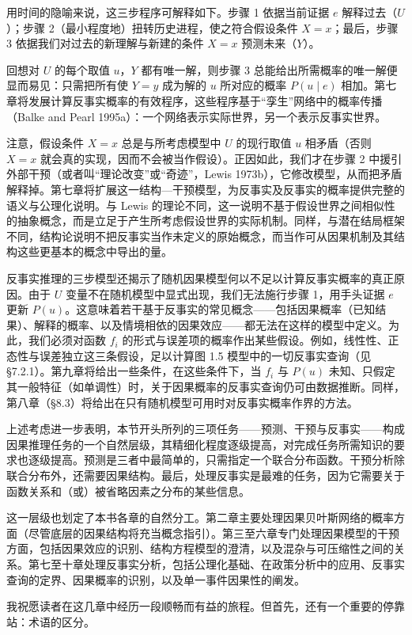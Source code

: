 用时间的隐喻来说，这三步程序可解释如下。步骤 1 依据当前证据 $e$ 解释过去（$U$）；步骤 2（最小程度地）扭转历史进程，使之符合假设条件 $X=x$；最后，步骤 3 依据我们对过去的新理解与新建的条件 $X=x$ 预测未来（$Y$）。

回想对 $U$ 的每个取值 $u$，$Y$ 都有唯一解，则步骤 3 总能给出所需概率的唯一解便显而易见：只需把所有使 $Y=y$ 成为解的 $u$ 所对应的概率 $P(u\mid e)$ 相加。第七章将发展计算反事实概率的有效程序，这些程序基于“孪生”网络中的概率传播（Balke and Pearl 1995a）：一个网络表示实际世界，另一个表示反事实世界。

注意，假设条件 $X=x$ 总是与所考虑模型中 $U$ 的现行取值 $u$ 相矛盾（否则 $X=x$ 就会真的实现，因而不会被当作假设）。正因如此，我们才在步骤 2 中援引外部干预（或者叫“理论改变”或“奇迹”，Lewis 1973b），它修改模型，从而把矛盾解释掉。第七章将扩展这一结构—干预模型，为反事实及反事实的概率提供完整的语义与公理化说明。与 Lewis 的理论不同，这一说明不基于假设世界之间相似性的抽象概念，而是立足于产生所考虑假设世界的实际机制。同样，与潜在结局框架不同，结构论说明不把反事实当作未定义的原始概念，而当作可从因果机制及其结构这些更基本的概念中导出的量。

反事实推理的三步模型还揭示了随机因果模型何以不足以计算反事实概率的真正原因。由于 $U$ 变量不在随机模型中显式出现，我们无法施行步骤 1，用手头证据 $e$ 更新 $P(u)$。这意味着若干基于反事实的常见概念——包括因果概率（已知结果）、解释的概率、以及情境相依的因果效应——都无法在这样的模型中定义。为此，我们必须对函数 $f_i$ 的形式与误差项的概率作出某些假设。例如，线性性、正态性与误差独立这三条假设，足以计算图 1.5 模型中的一切反事实查询（见 \S 7.2.1）。第九章将给出一些条件，在这些条件下，当 $f_i$ 与 $P(u)$ 未知、只假定其一般特征（如单调性）时，关于因果概率的反事实查询仍可由数据推断。同样，第八章（\S 8.3）将给出在只有随机模型可用时对反事实概率作界的方法。

上述考虑进一步表明，本节开头所列的三项任务——预测、干预与反事实——构成因果推理任务的一个自然层级，其精细化程度逐级提高，对完成任务所需知识的要求也逐级提高。预测是三者中最简单的，只需指定一个联合分布函数。干预分析除联合分布外，还需要因果结构。最后，处理反事实是最难的任务，因为它需要关于函数关系和（或）被省略因素之分布的某些信息。

这一层级也划定了本书各章的自然分工。第二章主要处理因果贝叶斯网络的概率方面（尽管底层的因果结构将充当概念指引）。第三至六章专门处理因果模型的干预方面，包括因果效应的识别、结构方程模型的澄清，以及混杂与可压缩性之间的关系。第七至十章处理反事实分析，包括公理化基础、在政策分析中的应用、反事实查询的定界、因果概率的识别，以及单一事件因果性的阐发。

我祝愿读者在这几章中经历一段顺畅而有益的旅程。但首先，还有一个重要的停靠站：术语的区分。
